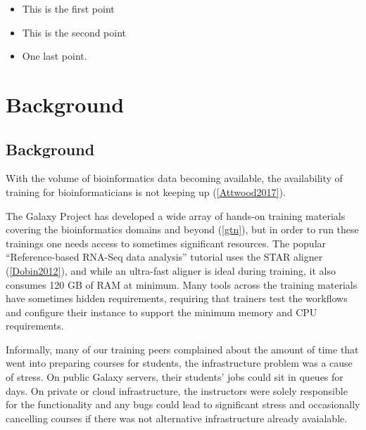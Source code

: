 \documentclass[a4paper,num-refs]{oup-contemporary}
\begin{document}
\begin{keypoints*}
\begin{itemize}
\item This is the first point
\item This is the second point
\item One last point.
\end{itemize}
\end{keypoints*}


\section{Background}
\label{sec:background}


\subsection{Background}
With the volume of bioinformatics data becoming available, the availability of training for bioinformaticians is not keeping up (\ref{Attwood2017}).

The Galaxy Project has developed a wide array of hands-on training materials covering the bioinformatics domains and beyond (\ref{gtn}), but in order to run these trainings one needs access to sometimes significant resources. The popular ``Reference-based RNA-Seq data analysis'' tutorial uses the STAR aligner (\ref{Dobin2012}), and while an ultra-fast aligner is ideal during training, it also consumes 120 GB of RAM at minimum. Many tools across the training materials have sometimes hidden requirements, requiring that trainers test the workflows and configure their instance to support the minimum memory and CPU requirements.

Informally, many of our training peers complained about the amount of time that went into preparing courses for students, the infrastructure problem was a cause of stress. On public Galaxy servers, their students' jobs could sit in queues for days. On private or cloud infrastructure, the instructors were solely responsible for the functionality and any bugs could lead to significant stress and occasionally cancelling courses if there was not alternative infrastructure already avaialable.
\end{document}
